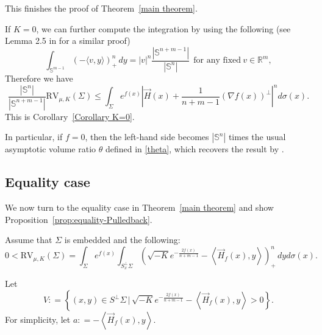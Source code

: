 \documentclass[psamsfonts]{amsart}
\theoremstyle{definition}
\theoremstyle{remark}
\numberwithin{equation}{section}
\begin{document}
This finishes the proof of Theorem~\ref{main theorem}. 

If $K = 0$, we can further compute the integration 
by using the following (see Lemma 2.5 in \cite{brendle2026} for a similar proof)
\begin{equation}
     \int_{\mathbb S^{m-1}} (-\langle v, y \rangle )^n
_+ \, dy = |v|^n \frac{|\mathbb{S}^{n+m-1}|}{|\mathbb{S}^n|} \ \ \mbox{for any fixed} \ v \in \mathbb R^m,  \label{integral}
\end{equation}
Therefore we have 
$$\frac{|\mathbb{S}^n|}{|\mathbb{S}^{n+m-1}|}\mathrm{RV}_{\mu,K}(\Sigma) \leq 
\int_\Sigma e^{f(x)} \left| \vec H(x) +\frac{1}{n+m-1}(\nabla f(x))^\perp \right|^n d\sigma(x).$$
This is Corollary~\ref{Corollary K=0}. 

In particular, if $f =0$, then the left-hand side becomes $|\mathbb{S}^n|$ times  the usual asymptotic volume ratio $\theta$ defined in \eqref{theta}, which recovers the result by \cite{JK2025, Pan-Yi2026}.

\subsection{Equality case}
We now turn to the equality case in Theorem~\ref{main theorem} and show Proposition~\ref{prop:equality-Pulledback}.

Assume that $\Sigma$ is embedded and the following:
\begin{equation} 0< \mathrm{RV}_{\mu, K} (\Sigma) = \int_\Sigma e^{f(x)} \int_{S_x^\perp \Sigma} \left( \sqrt{-K}e^{-\frac{2f(x)}{n+m-1}} - \left\langle \vec H_f (x), y \right\rangle \right)_+^n \, dy d\sigma(x). \label{Eq:equality case}
\end{equation}

Let $$V : = \left\{(x,y) \in S^\perp \Sigma \, |\, \sqrt{-K}e^{-\frac{2f(x)}{n+m-1}} - \left\langle \vec H_f (x), y \right\rangle>0 \right\}.$$
For simplicity, let $a : = - \left\langle \vec H_f (x), y \right\rangle$.
\end{document}
